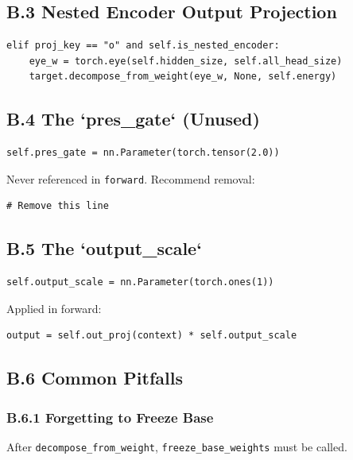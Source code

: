 \subsection{B.3 Nested Encoder Output Projection}

\begin{lstlisting}
elif proj_key == "o" and self.is_nested_encoder:
    eye_w = torch.eye(self.hidden_size, self.all_head_size)
    target.decompose_from_weight(eye_w, None, self.energy)
\end{lstlisting}

\subsection{B.4 The `pres\_gate` (Unused)}

\begin{lstlisting}
self.pres_gate = nn.Parameter(torch.tensor(2.0))
\end{lstlisting}

Never referenced in \texttt{forward}. Recommend removal:

\begin{lstlisting}
# Remove this line
\end{lstlisting}

\subsection{B.5 The `output\_scale`}

\begin{lstlisting}
self.output_scale = nn.Parameter(torch.ones(1))
\end{lstlisting}

Applied in forward:

\begin{lstlisting}
output = self.out_proj(context) * self.output_scale
\end{lstlisting}

\subsection{B.6 Common Pitfalls}

\subsubsection{B.6.1 Forgetting to Freeze Base}

After \texttt{decompose\_from\_weight}, \texttt{freeze\_base\_weights} must be called.

